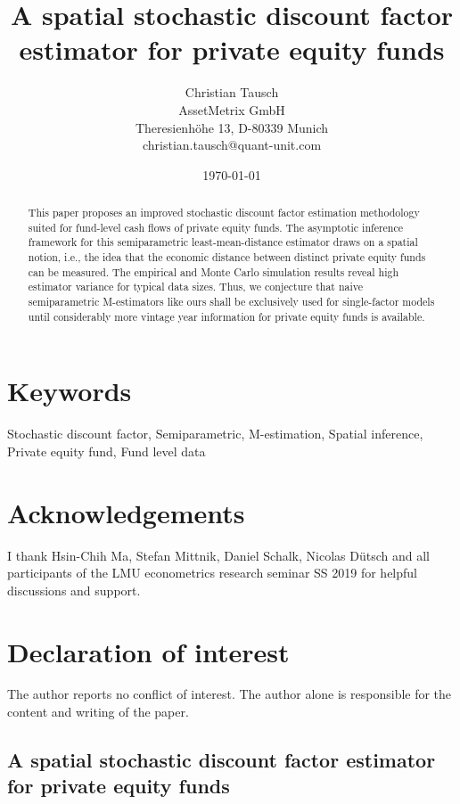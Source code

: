 \documentclass[12pt]{article}
\title{A spatial stochastic discount factor estimator for private equity funds}
\author{
	Christian Tausch  \\
	AssetMetrix GmbH  \\
	Theresienh\"{o}he 13, D-80339 Munich \\
	christian.tausch@quant-unit.com \\
	}
\date{\today}
\begin{document}
\maketitle


\section*{Keywords}
Stochastic discount factor, Semiparametric, M-estimation, Spatial inference, Private equity fund, Fund level data


\section*{Acknowledgements}
I thank Hsin-Chih Ma, Stefan Mittnik, Daniel Schalk, Nicolas D\"{u}tsch and all participants of the LMU econometrics research seminar SS 2019 for helpful discussions and support.


\section*{Declaration of interest}
The author reports no conflict of interest. 
The author alone is responsible for the content and writing of the paper.


\newpage
\doublespacing

\begin{center} 
\section*{A spatial stochastic discount factor estimator for private equity funds}
\end{center}



\begin{abstract}
This paper proposes an improved stochastic discount factor estimation methodology suited for fund-level cash flows of private equity funds.
The asymptotic inference framework for this semiparametric least-mean-distance estimator draws on a spatial notion, i.e., the idea that the economic distance between distinct private equity funds can be measured.
The empirical and Monte Carlo simulation results reveal high estimator variance for typical data sizes.
Thus, we conjecture that naive semiparametric M-estimators like ours shall be exclusively used for single-factor models until considerably more vintage year information for private equity funds is available.
\end{abstract}
\end{document}
